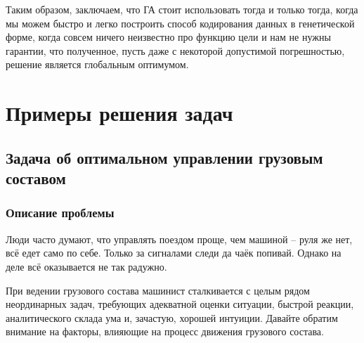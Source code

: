 Таким образом, заключаем, что ГА стоит использовать тогда и только тогда, когда мы можем быстро и легко построить способ кодирования данных в генетической форме, когда совсем ничего неизвестно про функцию цели и нам не нужны гарантии, что полученное, пусть даже с некоторой допустимой погрешностью, решение является глобальным оптимумом.
\chapter{Примеры решения задач}
\section{Задача об оптимальном управлении грузовым составом}
\subsection{Описание проблемы}
Люди часто думают, что управлять поездом проще, чем машиной -- руля же нет, всё едет само по себе. Только за сигналами следи да чаёк попивай.
Однако на деле всё оказывается не так радужно.

При ведении грузового состава машинист сталкивается с целым рядом неординарных задач, требующих адекватной оценки ситуации, быстрой реакции, аналитического склада ума и, зачастую, хорошей интуиции.
Давайте обратим внимание на факторы, влияющие на процесс движения грузового состава.


